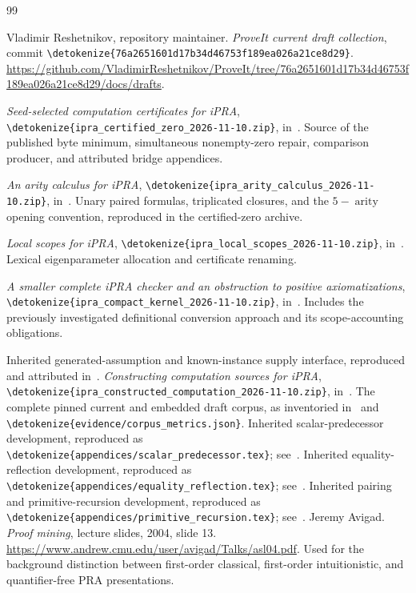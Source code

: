 \documentclass[11pt,letterpaper]{article}
\theoremstyle{definition}\newtheorem{definition}[theorem]{Definition}
\theoremstyle{remark}\newtheorem{remark}[theorem]{Remark}
\newcommand{\file}[1]{\expandafter\nolinkurl\expandafter{\detokenize{#1}}}
\begin{document}
\clearpage
\begin{thebibliography}{99}\raggedright
{} Vladimir Reshetnikov, repository maintainer.
\emph{ProveIt current draft collection}, commit
\file{76a2651601d17b34d46753f189ea026a21ce8d29}.
\url{https://github.com/VladimirReshetnikov/ProveIt/tree/76a2651601d17b34d46753f189ea026a21ce8d29/docs/drafts}.

 \emph{Seed-selected computation certificates for iPRA},
\file{ipra_certified_zero_2026-11-10.zip}, in~\cite{snapshot}.
Source of the published byte minimum, simultaneous nonempty-zero repair,
comparison producer, and attributed bridge appendices.

 \emph{An arity calculus for iPRA},
\file{ipra_arity_calculus_2026-11-10.zip}, in~\cite{snapshot}.
Unary paired formulas, triplicated closures, and the $5-\operatorname{arity}$
opening convention, reproduced in the certified-zero archive.

 \emph{Local scopes for iPRA},
\file{ipra_local_scopes_2026-11-10.zip}, in~\cite{snapshot}.
Lexical eigenparameter allocation and certificate renaming.

 \emph{A smaller complete iPRA checker and an obstruction
to positive axiomatizations}, \file{ipra_compact_kernel_2026-11-10.zip},
in~\cite{snapshot}. Includes the previously investigated definitional
conversion approach and its scope-accounting obligations.

 Inherited generated-assumption and known-instance
supply interface, reproduced and attributed in~\cite{certified,arity}.
 \emph{Constructing computation sources for iPRA},
\file{ipra_constructed_computation_2026-11-10.zip}, in~\cite{snapshot}.
 The complete pinned current and embedded draft corpus,
as inventoried in~\cite{snapshot} and \file{evidence/corpus_metrics.json}.
 Inherited scalar-predecessor development, reproduced
as \file{appendices/scalar_predecessor.tex}; see~\cite{certified}.
 Inherited equality-reflection development, reproduced
as \file{appendices/equality_reflection.tex}; see~\cite{certified}.
 Inherited pairing and primitive-recursion development,
reproduced as \file{appendices/primitive_recursion.tex}; see~\cite{certified}.
 Jeremy Avigad. \emph{Proof mining}, lecture slides, 2004,
slide 13. \url{https://www.andrew.cmu.edu/user/avigad/Talks/asl04.pdf}.
Used for the background distinction between first-order classical,
first-order intuitionistic, and quantifier-free PRA presentations.
\end{thebibliography}
\end{document}
